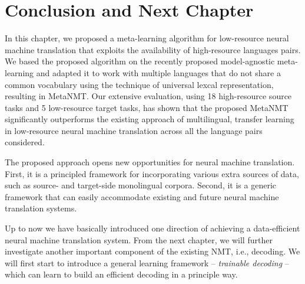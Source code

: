


\section{Conclusion and Next Chapter}

In this chapter, we proposed a meta-learning algorithm for low-resource neural machine translation that exploits the availability of high-resource languages pairs. We based the proposed algorithm on the recently proposed model-agnostic meta-learning and adapted it to work with multiple languages that do not share a common vocabulary using the technique of universal lexcal representation, resulting in MetaNMT. Our extensive evaluation, using 18 high-resource source tasks and 5 low-resource target tasks, has shown that the proposed MetaNMT significantly outperforms the existing approach of multilingual, transfer learning in low-resource neural machine translation across all the language pairs considered.

The proposed approach opens new opportunities for neural machine translation. First, it is a principled framework for incorporating various extra sources of data, such as source- and target-side monolingual corpora. Second, it is a generic framework that can easily accommodate existing and future neural machine translation systems. 

Up to now we have basically introduced one direction of achieving a data-efficient neural machine translation system. From the next chapter, we will further investigate another important component of the existing NMT, i.e., decoding. We will first start to introduce a general learning framework -- {\it trainable decoding} --which can learn to build an efficient decoding in a principle way.